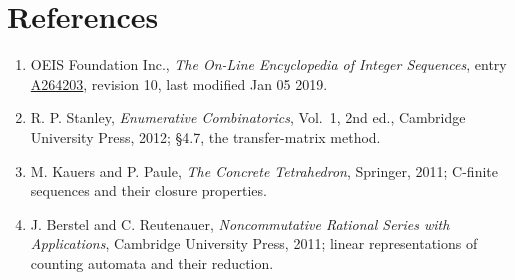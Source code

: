 \documentclass[11pt]{article}
\theoremstyle{definition}
\begin{document}
\section{References}

\begin{enumerate}

\item OEIS Foundation Inc., \emph{The On-Line Encyclopedia of Integer Sequences}, entry \href{https://oeis.org/A264203}{A264203}, revision 10, last modified Jan 05 2019.

\item R. P. Stanley, \emph{Enumerative Combinatorics}, Vol.~1, 2nd ed., Cambridge University Press, 2012; \S4.7, the transfer-matrix method.

\item M. Kauers and P. Paule, \emph{The Concrete Tetrahedron}, Springer, 2011; C-finite sequences and their closure properties.

\item J. Berstel and C. Reutenauer, \emph{Noncommutative Rational Series with Applications}, Cambridge University Press, 2011; linear representations of counting automata and their reduction.

\end{enumerate}
\end{document}
